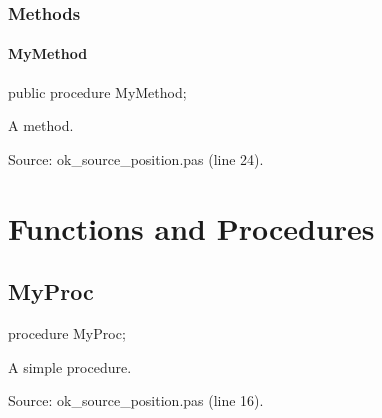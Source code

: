 \documentclass{report}
\begin{document}
\subsubsection*{\large{\textbf{Methods}}\normalsize\hspace{1ex}\hfill}
\paragraph*{MyMethod}\hspace*{\fill}

\begin{list}{}{
\setlength{\itemindent}{0cm}
\setlength{\listparindent}{0cm}
\setlength{\leftmargin}{\evensidemargin}
\addtolength{\leftmargin}{\tmplength}
\settowidth{\labelsep}{X}
\addtolength{\leftmargin}{\labelsep}
\setlength{\labelwidth}{\tmplength}
}
\begin{flushleft}
\item[\textbf{Declaration}\hfill]
\begin{ttfamily}
public procedure MyMethod;\end{ttfamily}


\end{flushleft}
\par
\item[\textbf{Description}]
A method.\par
Source: ok{\_}source{\_}position.pas (line 24).

\end{list}
\section{Functions and Procedures}
\subsection*{MyProc}
\begin{list}{}{
\setlength{\itemindent}{0cm}
\setlength{\listparindent}{0cm}
\setlength{\leftmargin}{\evensidemargin}
\addtolength{\leftmargin}{\tmplength}
\settowidth{\labelsep}{X}
\addtolength{\leftmargin}{\labelsep}
\setlength{\labelwidth}{\tmplength}
}
\begin{flushleft}
\item[\textbf{Declaration}\hfill]
\begin{ttfamily}
procedure MyProc;\end{ttfamily}


\end{flushleft}
\par
\item[\textbf{Description}]
A simple procedure.\par
Source: ok{\_}source{\_}position.pas (line 16).

\end{list}
\end{document}
